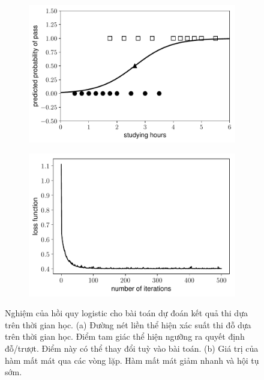 \begin{figure}[t]
    \begin{subfigure}{0.49\textwidth}
    \includegraphics[width=0.99\linewidth]{ebookML_src/src/logistic_regression/log_reg_res.pdf}
    \caption{}
    \label{fig:10_resa}
    \end{subfigure}
    \begin{subfigure}{0.49\textwidth}
    \includegraphics[width=0.99\linewidth]{ebookML_src/src/logistic_regression/log_reg_loss.pdf}
    \caption{}
    \label{fig:10_resb}
    \end{subfigure}
    \caption{
    Nghiệm của hồi quy logistic cho bài toán dự đoán kết quả thi dựa trên
    thời gian học. (a) Đường nét liền thể hiện xác suất thi đỗ dựa trên thời gian
    học. Điểm tam giác thể hiện ngưỡng ra quyết định đỗ/trượt. Điểm này có
    thể thay đổi tuỳ vào bài toán. (b) Giá trị của hàm mất mát qua các vòng lặp.
    Hàm mất mát giảm nhanh và hội tụ sớm. }
    \label{fig:10_res}
\end{figure}

